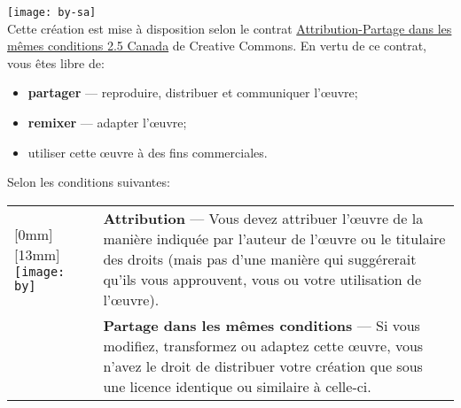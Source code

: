 \texttt{[image: by-sa]}\\%
Cette création est mise à disposition selon le contrat
\href{http://creativecommons.org/licenses/by-sa/2.5/ca/deed.fr}{%
  Attribution-Partage dans les mêmes conditions 2.5 Canada} de
Creative Commons. En vertu de ce contrat, vous êtes libre de:
\begin{itemize}
\item \textbf{partager} --- reproduire, distribuer et communiquer
  l'{\oe}uvre;
\item \textbf{remixer} --- adapter l'{\oe}uvre;
\item utiliser cette {\oe}uvre à des fins commerciales.
\end{itemize}
Selon les conditions suivantes:

\begin{tabularx}{\linewidth}{@{}lX@{}}
  \raisebox{-9mm}[0mm][13mm]{%
    \texttt{[image: by]}} &
  \textbf{Attribution} --- Vous devez attribuer l'{\oe}uvre de la
  manière indiquée par l'auteur de l'{\oe}uvre ou le titulaire des
  droits (mais pas d'une manière qui suggérerait qu'ils vous
  approuvent, vous ou votre utilisation de l'{\oe}uvre). \\
  \raisebox{-9mm}{\texttt{[image: sa]}}
  & \textbf{Partage dans les mêmes conditions} --- Si vous modifiez,
  transformez ou adaptez cette {\oe}uvre, vous n'avez le droit de
  distribuer votre création que sous une licence identique ou
  similaire à celle-ci.
\end{tabularx}
